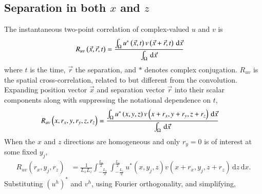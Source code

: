 \documentclass[letterpaper,11pt,nointlimits,reqno]{amsart}
\begin{document}
\subsection{Separation in both $x$ and $z$}
The instantaneous two-point correlation of complex-valued $u$ and $v$ is
\begin{align}
R_{uv} \left( \vec{x}, \vec{r}, t \right)
  &= \frac{%
     \int_\Omega
     u^\ast\left(\vec{x}          , t\right)
     v     \left(\vec{x} + \vec{r}, t\right)
     \,\mathrm{d}\vec{x}
  }{%
     \int_\Omega
     \,\mathrm{d}\vec{x}
  }
\end{align}
where $t$ is the time, $\vec{r}$ the separation, and $\ast$ denotes complex
conjugation.  $R_{uv}$ is the spatial cross-correlation, related to but
different from the convolution.  Expanding position vector $\vec{x}$ and
separation vector $\vec{r}$ into their scalar components along with suppressing
the notational dependence on $t$,
\begin{align}
R_{uv} \left( x, r_x, y, r_y, z, r_z \right)
  &= \frac{%
     \int_\Omega
     u^\ast\left( x      , y      , z       \right)
     v     \left( x + r_x, y + r_y, z + r_z \right)
     \,\mathrm{d}\vec{x}
  }{%
     \int_\Omega
     \,\mathrm{d}\vec{x}
  }
\end{align}
When the $x$ and $z$ directions are homogeneous and only $r_y=0$ is of interest
at some fixed $y_j$,
\begin{align}
R_{uv} \left( r_x, y_j, r_z \right)
  &= \frac{1}{L_x L_z}
     \int_{-\frac{L_x}{2}}^{\frac{L_x}{2}}
     \int_{-\frac{L_z}{2}}^{\frac{L_z}{2}}
       u^\ast\left( x      , y_j, z       \right)
       v     \left( x + r_x, y_j, z + r_z \right)
     \,\mathrm{d}z
     \,\mathrm{d}x.
\end{align}
Substituting $(u^h)^\ast$ and $v^h$, using Fourier orthogonality, and
simplifying,
\end{document}
